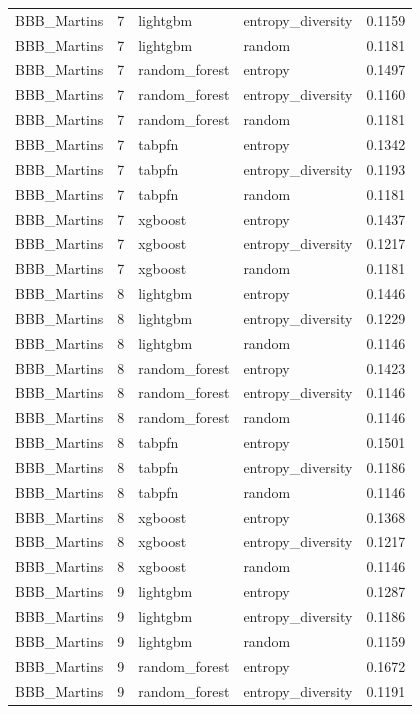 \begin{tabular}{lrllr}
BBB_Martins & 7 & lightgbm & entropy_diversity & 0.1159 \\
BBB_Martins & 7 & lightgbm & random & 0.1181 \\
BBB_Martins & 7 & random_forest & entropy & 0.1497 \\
BBB_Martins & 7 & random_forest & entropy_diversity & 0.1160 \\
BBB_Martins & 7 & random_forest & random & 0.1181 \\
BBB_Martins & 7 & tabpfn & entropy & 0.1342 \\
BBB_Martins & 7 & tabpfn & entropy_diversity & 0.1193 \\
BBB_Martins & 7 & tabpfn & random & 0.1181 \\
BBB_Martins & 7 & xgboost & entropy & 0.1437 \\
BBB_Martins & 7 & xgboost & entropy_diversity & 0.1217 \\
BBB_Martins & 7 & xgboost & random & 0.1181 \\
BBB_Martins & 8 & lightgbm & entropy & 0.1446 \\
BBB_Martins & 8 & lightgbm & entropy_diversity & 0.1229 \\
BBB_Martins & 8 & lightgbm & random & 0.1146 \\
BBB_Martins & 8 & random_forest & entropy & 0.1423 \\
BBB_Martins & 8 & random_forest & entropy_diversity & 0.1146 \\
BBB_Martins & 8 & random_forest & random & 0.1146 \\
BBB_Martins & 8 & tabpfn & entropy & 0.1501 \\
BBB_Martins & 8 & tabpfn & entropy_diversity & 0.1186 \\
BBB_Martins & 8 & tabpfn & random & 0.1146 \\
BBB_Martins & 8 & xgboost & entropy & 0.1368 \\
BBB_Martins & 8 & xgboost & entropy_diversity & 0.1217 \\
BBB_Martins & 8 & xgboost & random & 0.1146 \\
BBB_Martins & 9 & lightgbm & entropy & 0.1287 \\
BBB_Martins & 9 & lightgbm & entropy_diversity & 0.1186 \\
BBB_Martins & 9 & lightgbm & random & 0.1159 \\
BBB_Martins & 9 & random_forest & entropy & 0.1672 \\
BBB_Martins & 9 & random_forest & entropy_diversity & 0.1191 \\

\end{tabular}
